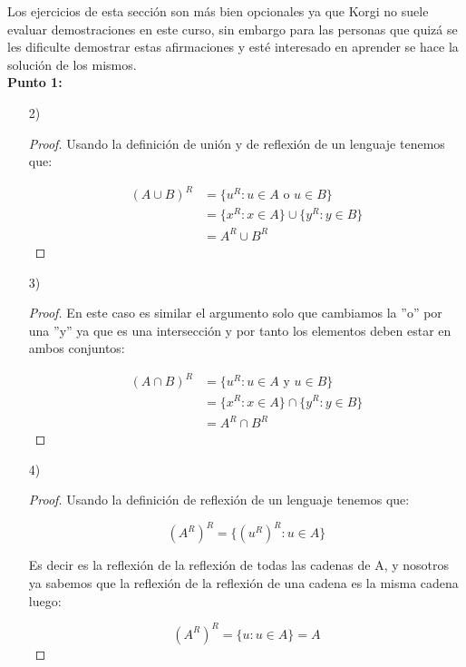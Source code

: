 Los ejercicios de esta sección son más bien opcionales ya que Korgi no suele evaluar demostraciones en este curso, sin embargo para las personas que quizá se les dificulte demostrar estas afirmaciones y esté interesado en aprender se hace la solución de los mismos.\\

\textbf{Punto 1:}

\begin{itemize}
    \item[2)]
    \begin{proof}
        Usando la definición de unión y de reflexión de un lenguaje tenemos que:

\begin{align*}
    (A \cup B)^R&=\{u^R: u \in A \text{ o } u\in B\}\\
    &=\{x^R: x\in A\}\cup\{y^R: y \in B\}\\
    &=A^R\cup B^R
\end{align*}  
    \end{proof}

    \item[3)] 

    \begin{proof}
        En este caso es similar el argumento solo que cambiamos la ''o'' por una ''y'' ya que es una intersección y por tanto los elementos deben estar en ambos conjuntos:

        \begin{align*}
              (A \cap B)^R&=\{u^R: u \in A \text{ y } u\in B\}\\
    &=\{x^R: x\in A\}\cap\{y^R: y \in B\}\\
    &=A^R\cap B^R
        \end{align*}
    \end{proof}

    \item[4)]\begin{proof}
        Usando la definición de reflexión de un lenguaje tenemos que:

        $$(A^R)^R=\{(u^R)^R:u\in A\}$$

        Es decir es la reflexión de la reflexión de todas las cadenas de A, y nosotros ya sabemos que la reflexión de la reflexión de una cadena es la misma cadena luego:

        $$(A^R)^R=\{u: u \in A\}=A$$

    \end{proof}


\end{itemize}
